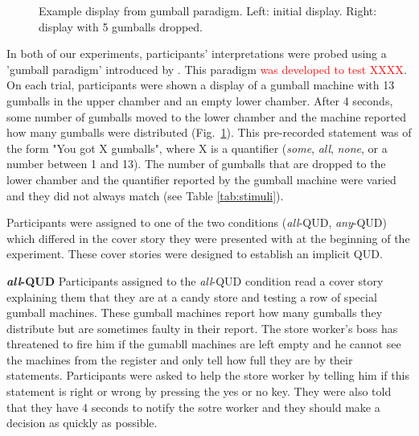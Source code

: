 \documentclass[10pt,letterpaper]{article}
\begin{document}
\begin{figure}
\caption{Example display from gumball paradigm. Left: initial display. Right: display with 5 gumballs dropped.  \label{fig:gumball-paradigm}}
\end{figure}

In both of our experiments, participants’ interpretations were probed using a ’gumball paradigm' introduced by . This paradigm \textcolor{red}{was developed to test XXXX}. On each trial, participants were shown a display of a gumball machine with 13 gumballs in the upper chamber and an empty lower chamber. After 4 seconds, some number of gumballs moved to the lower chamber and the machine reported how many gumballs were distributed (Fig.~\ref{fig:gumball-paradigm}). This pre-recorded statement was of the form "You got X gumballs", where X is a quantifier (\textit{some},  \textit{all}, \textit{none}, or a number between 1 and 13). The number of gumballs that are dropped to the lower chamber and the quantifier reported by the gumball machine were varied and they did not always match (see Table \ref{tab:stimuli}).

Participants were assigned to one of the two conditions (\textit{all}-QUD, \textit{any}-QUD) which differed in the cover story they were presented with at the beginning of the experiment. These cover stories were designed to establish an implicit QUD.

\textbf{\textit{all}-QUD} Participants assigned to the \textit{all}-QUD condition read a cover story explaining them that they are at a candy store and testing a row of special gumball machines. These gumball machines report how many gumballs they distribute but are sometimes faulty in their report. The store worker's boss has threatened to fire him if the gumabll machines are left empty and he cannot see the machines from the register and only tell how full they are by their statements. Participants were asked to help the store worker by telling him if this statement is right or wrong by pressing the yes or no key. They were also told that they have 4 seconds to notify the sotre worker and they should make a decision as quickly as possible. 
\end{document}
